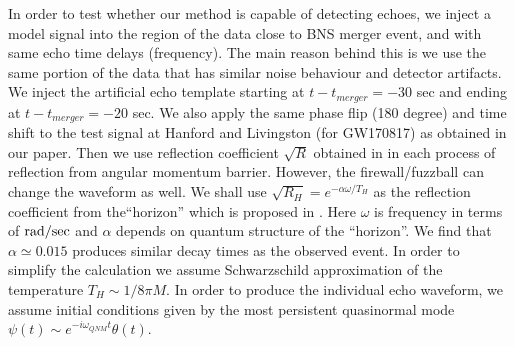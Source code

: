 \documentclass[12pt]{article}
\begin{document}
In order to test whether our method is capable of detecting echoes, we inject a model signal into the region of the data close to BNS merger event, and with same echo time delays (frequency). The main reason behind this is we use the same portion of the data that has similar noise behaviour and detector artifacts. 
 We inject the artificial echo template starting at $t-t_{merger}=-30$ sec and ending at $t-t_{merger}=-20$ sec. We also apply the same phase flip (180 degree) and time shift to the test signal at Hanford and Livingston (for GW170817) as obtained in our paper. Then we use reflection coefficient $\sqrt{R}$ obtained in  \cite{Nakano:2017fvh} in each process of reflection from angular momentum barrier. However, the firewall/fuzzball can change the waveform as well. We shall use $\sqrt{R_{H}} =e^{-\alpha \omega/T_{H}}$  as the reflection coefficient from the``horizon'' which is proposed in \cite{Oshita:2018fqu}. Here $\omega$ is frequency in terms of $\rm{rad}/\rm{sec}$ and $\alpha$ depends on quantum structure of the ``horizon''. We find that $\alpha \simeq 0.015$ produces similar decay times as the observed event. In order to simplify the calculation we assume Schwarzschild approximation of the temperature $T_{H} \sim 1/8\pi M$.  In order to produce the individual echo waveform, we assume initial conditions given by the most persistent quasinormal mode  $\psi(t) \sim e^{-i\omega_{QNM}t} \theta(t)$. 
  
\end{document}
